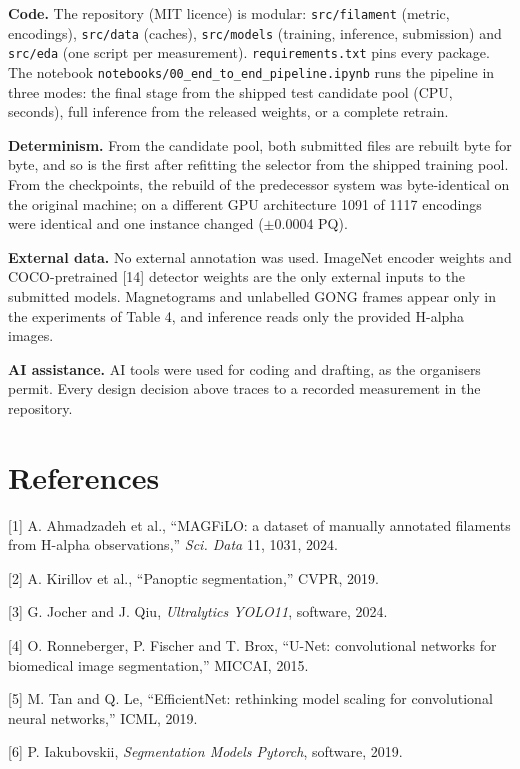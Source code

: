 \textbf{Code.} The repository (MIT licence) is modular: \texttt{src/filament} (metric, encodings), \texttt{src/data}
(caches), \texttt{src/models} (training, inference, submission) and \texttt{src/eda} (one script per
measurement). \texttt{requirements.txt} pins every package. The notebook
\texttt{notebooks/00\_end\_to\_end\_pipeline.ipynb} runs the pipeline in three modes: the final stage from
the shipped test candidate pool (CPU, seconds), full inference from the released weights, or a
complete retrain.

\textbf{Determinism.} From the candidate pool, both submitted files are rebuilt byte for byte, and so
is the first after refitting the selector from the shipped training pool. From the checkpoints,
the rebuild of the predecessor system was byte-identical on the original machine; on a different
GPU architecture 1091 of 1117 encodings were identical and one instance changed ($\pm$0.0004 PQ).

\textbf{External data.} No external annotation was used. ImageNet encoder weights and COCO-pretrained
{[}14{]} detector weights are the only external inputs to the submitted models. Magnetograms and
unlabelled GONG frames appear only in the experiments of Table 4, and inference reads only the
provided H-alpha images.

\textbf{AI assistance.} AI tools were used for coding and drafting, as the organisers permit. Every
design decision above traces to a recorded measurement in the repository.

\section{References}\label{references}

{[}1{]} A. Ahmadzadeh et al., ``MAGFiLO: a dataset of manually annotated filaments from H-alpha observations,'' \emph{Sci. Data} 11, 1031, 2024.

{[}2{]} A. Kirillov et al., ``Panoptic segmentation,'' CVPR, 2019.

{[}3{]} G. Jocher and J. Qiu, \emph{Ultralytics YOLO11}, software, 2024.

{[}4{]} O. Ronneberger, P. Fischer and T. Brox, ``U-Net: convolutional networks for biomedical image segmentation,'' MICCAI, 2015.

{[}5{]} M. Tan and Q. Le, ``EfficientNet: rethinking model scaling for convolutional neural networks,'' ICML, 2019.

{[}6{]} P. Iakubovskii, \emph{Segmentation Models Pytorch}, software, 2019.

